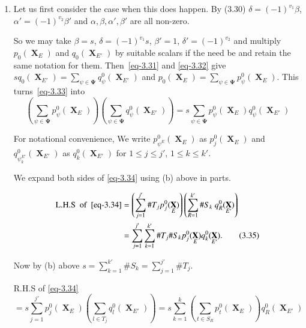 \documentclass[a4paper,12pt]{article}
\DeclareMathOperator{\x}{\mathrm{X}}
\theoremstyle{definition}
\theoremstyle{underlinethm}
\theoremstyle{definition}
\begin{document}
\begin{enumerate}[label=(\alph*)]
 \item Let us first consider the case when this does happen. By (3.30) $\delta = (-1)^{v_{1}} \beta$, $\alpha' = (-1)^{v_{2}} \beta'$ and $\alpha, \beta, \alpha', \beta'$ are all non-zero.
 
 So we may take $\beta = s$, $\delta = (-1)^{v_{1}} s$, $\beta' = 1$, $\delta' = (-1)^{v_{2}}$ and multiply $p_{0}(\boldsymbol{\x}_{E})$ and $q_{0}(\boldsymbol{\x}_{E'})$ by suitable scalars if the need be and retain the same notation for them. Then~\eqref{eq-3.31} and \eqref{eq-3.32} give $s q_{0}(\boldsymbol{\x}_{E'}) = \sum\limits_{\psi \in \boldsymbol{\Psi}} q_{\psi}^{0} (\boldsymbol{\x}_{E'})$ and $p_{0}(\boldsymbol{\x}_{E}) = \sum\limits_{\psi \in \boldsymbol{\Psi}} p^{0}_{\psi}(\boldsymbol{\x}_{E})$. This turns~\eqref{eq-3.33} into
 \begin{equation}
 \left(\sum_{\psi \in \boldsymbol{\Psi}} p^{0}_{\psi}(\boldsymbol{\x}_{E})\right) \left(\sum_{\psi \in \boldsymbol{\Psi}} q^{0}_{\psi} (\boldsymbol{\x}_{E'})\right) = s \sum_{\psi \in \boldsymbol{\Psi}} p^{0}_{\psi} (\boldsymbol{\x}_{E}) q^{0}_{\psi}(\boldsymbol{\x}_{E'})\tag{3.34}\label{eq-3.34} 
  \end{equation}

For notational convenience, We write $p_{\psi^{E}}^{0} (\boldsymbol{\x}_{E})$ as $p^{0}_{j}(\boldsymbol{\x}_{E})$ and $q^{0}_{\psi_{k}^{E'}} (\boldsymbol{\x}_{E'})$ as $q_{k}^{0}(\boldsymbol{\x}_{E'})$ for $1\leq j \leq j'$, $1\leq k \leq k'$. 

We expand both sides of \eqref{eq-3.34} using (b) above in parts.

\begin{align*}
\text{L.H.S}~~\text{of}~~{\eqref{eq-3.34}} &= \left(\sum_{j=1}^{j'}  \# T_{j} p_{j}^{0}(\boldsymbol{\x}_{E})\right)\left(\sum_{R=1}^{k'} \#S_{k}~ q_{R}^{0}(\boldsymbol{\x}_{E'})\right)\\
&= \sum_{j=1}^{j'} \sum_{k=1}^{k'} \# T_{j} \#S_{k} p_{j}^{0}(\boldsymbol{\x}_{E}) q_{k}^{0}(\boldsymbol{\x}_{E'}).\tag{3.35}\label{eq-3.35}
\end{align*}

Now by (b) above $s= \sum_{k=1}^{k'} \# S_{k} = \sum_{j=1}^{j'} \# T_{j}$.

R.H.S of \eqref{eq-3.34}
\begin{equation}
= s\sum_{j=1}^{j'} p_{j}^{0} (\boldsymbol{\x}_{E}) \left(\sum_{l \in T_{j}} q_{l}^{0}(\boldsymbol{\x}_{E'})\right) = s\sum_{k=1}^{k}  \left(\sum_{t \in S_{R}}  p_{t}^{0} (\boldsymbol{\x}_{E})\right) q_{R}^{0} (\boldsymbol{\x}_{E'})\tag{3.36}\label{eq-3.36}
\end{equation}


\end{enumerate}
\end{document}
